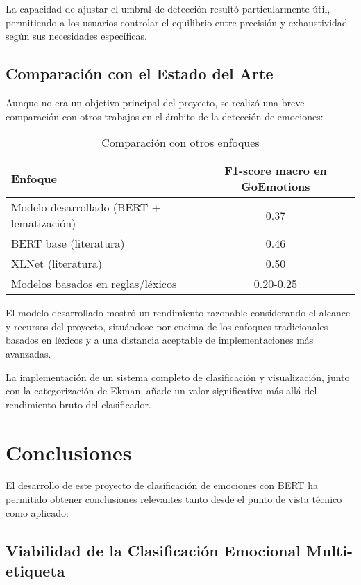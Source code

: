\documentclass[12pt,a4paper]{report}
\begin{document}
La capacidad de ajustar el umbral de detección resultó particularmente útil, permitiendo a los usuarios controlar el equilibrio entre precisión y exhaustividad según sus necesidades específicas.

\subsection{Comparación con el Estado del Arte}

Aunque no era un objetivo principal del proyecto, se realizó una breve comparación con otros trabajos en el ámbito de la detección de emociones:

\begin{table}[htbp]
  \centering
  \caption{Comparación con otros enfoques}
  \begin{tabular}{lc}
    \toprule
    \textbf{Enfoque} & \textbf{F1-score macro en GoEmotions} \\
    \midrule
    Modelo desarrollado (BERT + lematización) & 0.37 \\
    BERT base (literatura) & 0.46 \\
    XLNet (literatura) & 0.50 \\
    Modelos basados en reglas/léxicos & 0.20-0.25 \\
    \bottomrule
  \end{tabular}
\end{table}

El modelo desarrollado mostró un rendimiento razonable considerando el alcance y recursos del proyecto, situándose por encima de los enfoques tradicionales basados en léxicos y a una distancia aceptable de implementaciones más avanzadas.

La implementación de un sistema completo de clasificación y visualización, junto con la categorización de Ekman, añade un valor significativo más allá del rendimiento bruto del clasificador.

\section{Conclusiones}

El desarrollo de este proyecto de clasificación de emociones con BERT ha permitido obtener conclusiones relevantes tanto desde el punto de vista técnico como aplicado:

\subsection{Viabilidad de la Clasificación Emocional Multi-etiqueta}
\end{document}

